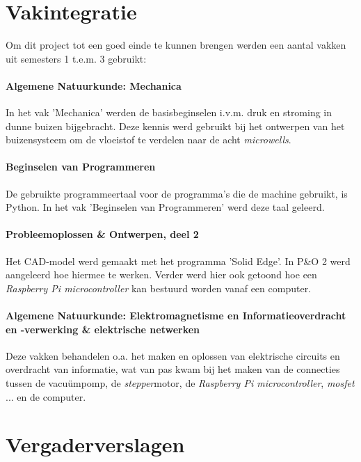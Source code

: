 \documentclass[a4paper,twoside,kulak]{kulakreport} %
\begin{document}
\clearpage

\section*{Vakintegratie}
Om dit project tot een goed einde te kunnen brengen werden een aantal vakken uit semesters 1 t.e.m. 3 gebruikt:

\paragraph{Algemene Natuurkunde: Mechanica}

In het vak 'Mechanica' werden de basisbeginselen i.v.m. druk en stroming in dunne buizen bijgebracht. Deze kennis werd gebruikt bij het ontwerpen van het buizensysteem om de vloeistof te verdelen naar de acht \textit{microwells}.

\paragraph{Beginselen van Programmeren}

De gebruikte programmeertaal voor de programma's die de machine gebruikt, is Python. In het vak 'Beginselen van Programmeren' werd deze taal geleerd. 

\paragraph{Probleemoplossen \& Ontwerpen, deel 2}

Het CAD-model werd gemaakt met het programma 'Solid Edge'. In P\&O 2 werd aangeleerd hoe hiermee te werken. Verder werd hier ook getoond hoe een \textit{Raspberry Pi microcontroller} kan bestuurd worden vanaf een computer. 

\paragraph{Algemene Natuurkunde: Elektromagnetisme en Informatieoverdracht en -verwerking \& elektrische netwerken}

Deze vakken behandelen o.a. het maken en oplossen van elektrische circuits en overdracht van informatie, wat van pas kwam bij het maken van de connecties tussen de vacuümpomp, de \textit{stepper}motor, de \textit{Raspberry Pi microcontroller}, \textit{mosfet} ... en de computer.

\section*{Vergaderverslagen}






 
\end{document}
